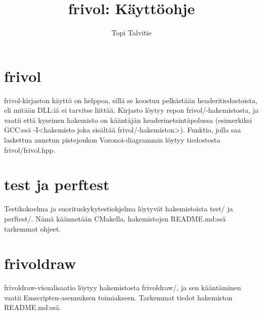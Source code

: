 \documentclass[a4paper, 11pt, finnish]{article}
\author{Topi Talvitie}
\title{frivol: Käyttöohje}
\begin{document}
\maketitle

\section*{frivol}
frivol-kirjaston käyttö on helppoa, sillä se koostuu pelkästään headeritiedostoista, eli mitään DLL:iä ei tarvitse liittää. Kirjasto löytyy repon frivol/-hakemistosta, ja vaatii että kyseinen hakemisto on kääntäjän headerinetsintäpolussa (esimerkiksi GCC:ssä -I<hakemisto joka sisältää frivol/-hakemiston>). Funktio, jolla saa laskettua annetun pistejoukon Voronoi-diagrammin löytyy tiedostosta frivol/frivol.hpp.

\section*{test ja perftest}
Testikokoelma ja suorituskykytestiohjelma löytyvät hakemistoista test/ ja perftest/. Nämä käännetään CMakella, hakemistojen README.md:ssä tarkemmat ohjeet.

\section*{frivoldraw}
frivoldraw-visualisaatio löytyy hakemistosta frivoldraw/, ja sen kääntäminen vaatii Emscripten-asennuksen toimiakseen. Tarkemmat tiedot hakemiston README.md:ssä.
\end{document}
